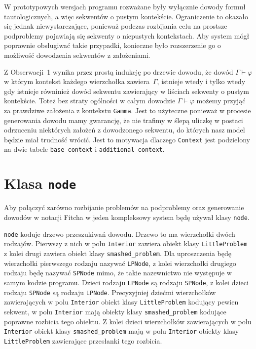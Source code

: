 \documentclass{article}
\begin{document}
W prototypowych wersjach programu rozważane były wyłącznie dowody formuł tautologicznych, a więc sekwentów o pustym kontekście. Ograniczenie to okazało się jednak niewystarczające, ponieważ podczas rozbijania celu na prostsze podproblemy pojawiają się sekwenty o niepustych kontekstach. Aby system mógł poprawnie obsługiwać takie przypadki, konieczne było rozszerzenie go o możliwość dowodzenia sekwentów z założeniami.

Z Obserwacji~1 wynika przez prostą indukcję po drzewie dowodu, że dowód
$\Gamma \vdash \varphi$ w którym kontekst każdego wierzchołka zawiera~$\Gamma$, istnieje wtedy i tylko wtedy gdy istnieje równinież dowód sekwentu zawierający w liściach sekwenty o pustym kontekście. Toteż bez straty ogólności w całym dowodzie $\Gamma \vdash \varphi$ możemy przyjąć za prawdziwe założenia z kontekstu \texttt{Gamma}. Jest to użyteczne  ponieważ w procesie generowania dowodu mamy gwarancję, że nie trafimy w ślepą uliczkę w postaci odrzuceniu niektórych 
założeń z dowodzonego sekwentu, do których nasz model będzie miał trudność wrócić. Jest to motywacja dlaczego \texttt{Context} jest podzielony na dwie tabele \texttt{base\_context} i \texttt{additional\_context}.


\section{Klasa \texttt{node}}

Aby połączyć zarówno rozbijanie problemów na podproblemy oraz generowanie dowodów w notacji Fitcha w jeden kompleksowy system będę używał klasy \texttt{node}. 
 
\texttt{node} koduje drzewo przeszukiwań dowodu. Drzewo to ma wierzchołki dwóch rodzajów. Pierwszy z nich w polu \texttt{Interior} zawiera obiekt klasy \texttt{LittleProblem} z kolei drugi zawiera obiekt klasy \texttt{smashed\_problem}.
Dla uproszczenia będę wierzchołki pierwszego rodzaju nazywać \texttt{LPNode}, z kolei wierzchołki drugiego rodzaju będę nazywać \texttt{SPNode} mimo, że takie nazewnictwo nie występuje w samym kodzie programu. Dzieci rodzaju \texttt{LPNode} są rodzaju \texttt{SPNode}, z kolei dzieci rodzaju \texttt{SPNode} są rodzaju \texttt{LPNode}. Precyzyjniej dziećmi wierzchołków zawierających w polu \texttt{Interior} obiekt klasy \texttt{LittleProblem} kodujący pewien sekwent, w polu \texttt{Interior} mają obiekty klasy \texttt{smashed\_problem} kodujące poprawne rozbicia tego obiektu. Z kolei dzieci wierzchołków zawierających w polu \texttt{Interior} obiekt klasy \texttt{smashed\_problem} mają w polu \texttt{Interior} obiekty klasy \texttt{LittleProblem} zawierające przesłanki tego rozbicia. 
\end{document}
